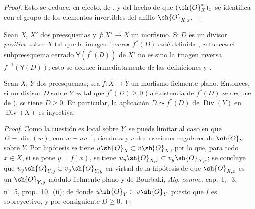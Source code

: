 \begin{proof}
Esto se deduce, en efecto, de ,  y del hecho de que $(\sh{O}_X^*)_x$ se identifica con el grupo de los elementos invertibles del anillo $\sh{O}_{X,x}$.
\end{proof}

\begin{env}[21.4.7]
\label{IV.21.4.7}
Sean $X$, $X'$ dos preesquemas y $f:X'\to X$ un morfismo.
Si $D$ es un divisor \emph{positivo} sobre $X$ tal que la imagen inversa $f^*(D)$ esté definida , entonces el subpreesquema cerrado $\boldsymbol{\mathsf{Y}}(f^*(D))$ de $X'$ no es sino la imagen inversa $f^{-1}(\boldsymbol{\mathsf{Y}}(D))$;
esto se deduce inmediatamente de las definiciones  y .
\end{env}

\begin{proposition}[21.4.8]
\label{IV.21.4.8}
Sean $X$, $Y$ dos preesquemas;
sea $f:X\to Y$ un morfismo fielmente plano.
Entonces, si un divisor $D$ sobre $Y$ es tal que $f^*(D)\geq0$ \textup{(la existencia de $f^*(D)$ se deduce de )}, se tiene $D\geq0$.
En particular, la aplicación $D\leadsto f^*(D)$ de $\operatorname{Div}(Y)$ en $\operatorname{Div}(X)$ es inyectiva.
\end{proposition}

\begin{proof}
Como la cuestión es local sobre $Y$, se puede limitar al caso en que $D=\operatorname{div}(w)$, con $w=uv^{-1}$, siendo $u$ y $v$ dos secciones regulares de $\sh{O}_Y$ sobre $Y$.
Por hipótesis se tiene $u\sh{O}_X\subset v\sh{O}_X$, por lo que, para todo $x\in X$, si se pone $y=f(x)$, se tiene $u_y\sh{O}_{X,x}\subset v_y\sh{O}_{X,x}$;
se concluye que $u_y\sh{O}_{Y,y}\subset v_y\sh{O}_{Y,y}$ en virtud de la hipótesis de que $\sh{O}_{X,x}$ es un $\sh{O}_{Y,y}$-módulo fielmente plano y de Bourbaki, \emph{Alg. comm.}, cap.~I, \textsection~3, n\textsuperscript{o}~5, prop.~10,~(ii);
de donde $u\sh{O}_Y\subset v\sh{O}_Y$ puesto que $f$ es sobreyectivo, y por consiguiente $D\geq0$.
\end{proof}


